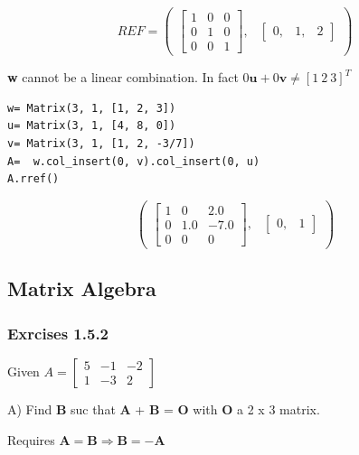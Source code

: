 \begin{equation}
REF= \begin{pmatrix}\left[\begin{matrix}1 & 0 & 0\\0 & 1 & 0\\0 & 0 & 1\end{matrix}\right], & \begin{bmatrix}0, & 1, & 2\end{bmatrix}\end{pmatrix}
\end{equation}

\textbf{w} cannot be a linear combination. In fact
$0\mathbf{u} + 0\mathbf{v} \neq [1\ 2\ 3]^T$

\begin{verbatim}
w= Matrix(3, 1, [1, 2, 3])
u= Matrix(3, 1, [4, 8, 0])
v= Matrix(3, 1, [1, 2, -3/7])
A=  w.col_insert(0, v).col_insert(0, u)
A.rref()
\end{verbatim}

\begin{equation}
\begin{pmatrix}\left[\begin{matrix}1 & 0 & 2.0\\0 & 1.0 & -7.0\\0 & 0 & 0\end{matrix}\right], & \begin{bmatrix}0, & 1\end{bmatrix}\end{pmatrix}
\end{equation}

\subsection{Matrix Algebra}

\subsubsection{Exrcises 1.5.2}

Given $A = \left[\begin{matrix}5 & -1 & -2\\1 & -3 & 2\end{matrix}\right]$

A) Find \textbf{B} suc that \textbf{A} + \textbf{B} = \textbf{O} with \textbf{O}
a 2 x 3 matrix.

Requires $\mathbf{A} = \mathbf{B} \Rightarrow \mathbf{B} = -\mathbf{A}$

